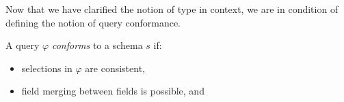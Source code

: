 
Now that we have clarified the notion of type in context, we are in condition of defining the notion of query conformance. 

\begin{definition}
A \gql query $\varphi$ \textit{conforms} to a schema $s$ if:
\begin{itemize}
    \item selections in $\varphi$ are consistent, 

    \item field merging between fields is possible, and


\end{itemize}
\end{definition}
